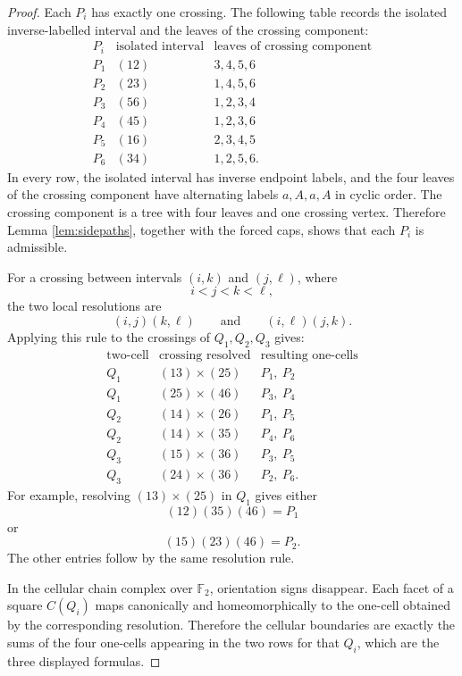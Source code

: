 \documentclass[12pt]{article}
\newcommand{\Ftwo}{\mathbb{F}_2}
\theoremstyle{definition}
\begin{document}
\begin{proof}
Each \(P_i\) has exactly one crossing.  The following table records the isolated inverse-labelled interval and the leaves of the crossing component:
\[
\begin{array}{c|c|c}
P_i & \text{isolated interval} & \text{leaves of crossing component}\\
\hline
P_1 & (12) & 3,4,5,6\\
P_2 & (23) & 1,4,5,6\\
P_3 & (56) & 1,2,3,4\\
P_4 & (45) & 1,2,3,6\\
P_5 & (16) & 2,3,4,5\\
P_6 & (34) & 1,2,5,6.
\end{array}
\]
In every row, the isolated interval has inverse endpoint labels, and the four leaves of the crossing component have alternating labels \(a,A,a,A\) in cyclic order.  The crossing component is a tree with four leaves and one crossing vertex.  Therefore Lemma \ref{lem:sidepaths}, together with the forced caps, shows that each \(P_i\) is admissible.

For a crossing between intervals \((i,k)\) and \((j,\ell)\), where
\[
i<j<k<\ell,
\]
the two local resolutions are
\[
(i,j)(k,\ell)
\qquad\text{and}\qquad
(i,\ell)(j,k).
\]
Applying this rule to the crossings of \(Q_1,Q_2,Q_3\) gives:
\[
\begin{array}{c|c|c}
\text{two-cell} & \text{crossing resolved} & \text{resulting one-cells}\\
\hline
Q_1 & (13)\times(25) & P_1,\ P_2\\
Q_1 & (25)\times(46) & P_3,\ P_4\\
\hline
Q_2 & (14)\times(26) & P_1,\ P_5\\
Q_2 & (14)\times(35) & P_4,\ P_6\\
\hline
Q_3 & (15)\times(36) & P_3,\ P_5\\
Q_3 & (24)\times(36) & P_2,\ P_6.
\end{array}
\]
For example, resolving \((13)\times(25)\) in \(Q_1\) gives either
\[
(12)(35)(46)=P_1
\]
or
\[
(15)(23)(46)=P_2.
\]
The other entries follow by the same resolution rule.

In the cellular chain complex over \(\Ftwo\), orientation signs disappear.  Each facet of a square \(C(Q_i)\) maps canonically and homeomorphically to the one-cell obtained by the corresponding resolution.  Therefore the cellular boundaries are exactly the sums of the four one-cells appearing in the two rows for that \(Q_i\), which are the three displayed formulas.
\end{proof}
\end{document}
